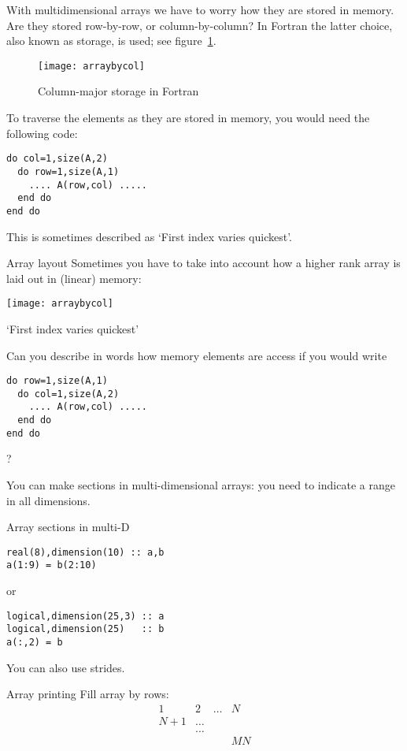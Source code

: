 With multidimensional arrays we have to worry how they are stored in
memory. Are they stored row-by-row, or column-by-column? In Fortran
the latter choice, also known as  storage,
is used; see figure~\ref{fig:column-major}.

\begin{figure}[ht]
  \texttt{[image: arraybycol]}
  \caption{Column-major storage in Fortran}
  \label{fig:column-major}
\end{figure}

To traverse the elements as they are stored in memory, you would need
the following code:
\begin{lstlisting}
do col=1,size(A,2)
  do row=1,size(A,1)
    .... A(row,col) .....
  end do
end do
\end{lstlisting}
This is sometimes described as `First index varies quickest'.

\begin{slide}{Array layout}
  \label{sl:farray-layout}
  Sometimes you have to take into account how a higher rank array
  is laid out in (linear) memory:

  \texttt{[image: arraybycol]}

  `First index varies quickest'
\end{slide}

\begin{exercise}
  Can you describe in words how memory elements are access if you
  would write
\begin{lstlisting}
do row=1,size(A,1)
  do col=1,size(A,2)
    .... A(row,col) .....
  end do
end do
\end{lstlisting}
?
\end{exercise}

You can make sections in multi-dimensional arrays: you need to
indicate a range in all dimensions.

\begin{block}{Array sections in multi-D}
  \label{sl:farray-sectiond}
\begin{lstlisting}
real(8),dimension(10) :: a,b
a(1:9) = b(2:10)
\end{lstlisting}
or
\begin{lstlisting}
logical,dimension(25,3) :: a
logical,dimension(25)   :: b
a(:,2) = b
\end{lstlisting}
You can also use strides.
\end{block}

\begin{block}{Array printing}
  \label{sl:farray-print}
  Fill array by rows:
  \[ \begin{matrix}1&2&\ldots&N\\ N+1&\ldots\\ &\ldots\\ &&&MN
  \end{matrix}
  \]
\end{block}

